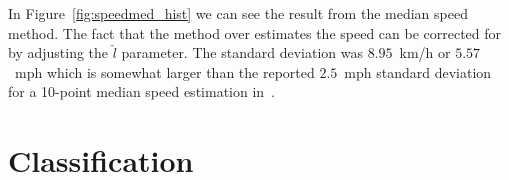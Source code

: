 In Figure~\ref{fig:speedmed_hist} we can see the result from the median speed method. The fact that the method over estimates the speed can be corrected for by adjusting the $\hat{l}$ parameter. The standard deviation was \mbox{$8.95$~km/h} or \mbox{$5.57$~mph} which is somewhat larger than the reported $2.5$~mph standard deviation for a 10-point median speed estimation in~\cite{cheung2005-2}.



\section{Classification}

